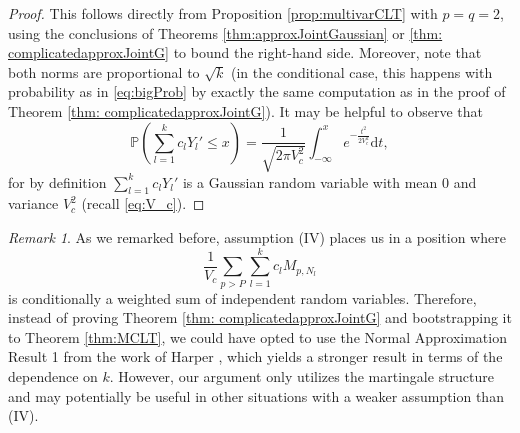 \documentclass[11pt]{tran-l}
\theoremstyle{definition}
\theoremstyle{remark}
\newtheorem{remark}[theorem]{Remark}
\numberwithin{equation}{section}
\begin{document}
\begin{proof}
This follows directly from Proposition \ref{prop:multivarCLT} with $p=q=2$, using the conclusions of Theorems \ref{thm:approxJointGaussian} or \ref{thm: complicatedapproxJointG} to bound the right-hand side. Moreover, note that both norms are proportional to $\sqrt k$ (in the conditional case, this happens with probability as in \eqref{eq:bigProb} by exactly the same computation as in the proof of Theorem \ref{thm: complicatedapproxJointG}). It may be helpful to observe that 
\begin{equation*}
    \mathbb P \left(\sum_{l=1}^k c_lY_l'\leq x \right) =\frac{1}{\sqrt{2\pi V_c^2}} \int_{-\infty}^x e^{-\frac{t^2}{2V_c^2}}\text{d}t,
\end{equation*}
for by definition $\sum_{l=1}^k c_lY_l'$ is a Gaussian random variable with mean $0$ and variance $V_c^2$ (recall \eqref{eq:V_c}). 
\end{proof}

\begin{remark}
    As we remarked before, assumption (IV) places us in a position where 
    \begin{equation*}
         \frac{1}{V_c}\sum_{p>P}\sum_{l=1}^k c_l M_{p, N_l}
    \end{equation*}
    is conditionally a weighted sum of independent random variables. Therefore, instead of proving Theorem \ref{thm: complicatedapproxJointG} and bootstrapping it to Theorem \ref{thm:MCLT}, we could have opted to use the Normal Approximation Result 1 from the work of Harper \cite{Harper2023_ASLF}, which yields a stronger result in terms of the dependence on $k$. However, our argument only utilizes the martingale structure and may potentially be useful in other situations with a weaker assumption than (IV). 
\end{remark}
\end{document}
